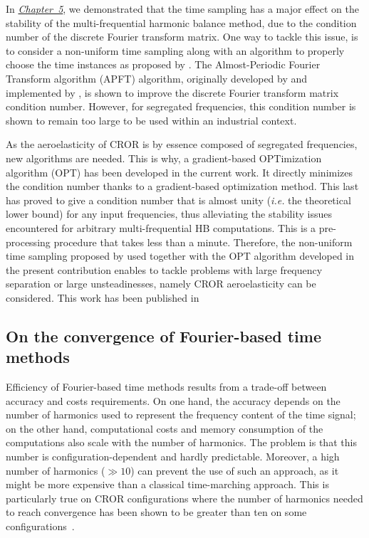 In \hyperref[cha:limitations_condition_number]{\emph{Chapter~5}},
we demonstrated that the time sampling has a major effect on the
stability of the multi-frequential harmonic balance 
method, due to the condition number of the discrete Fourier
transform matrix. One way to tackle this issue, 
is to consider a non-uniform time sampling
along with an algorithm to properly choose the time instances
as proposed by \citet{ThesisGuedeney}.
The Almost-Periodic Fourier Transform algorithm (APFT) 
algorithm, originally developed by \citet{Kundert1988} and implemented by 
\citet{ThesisGuedeney}, is shown to improve the discrete
Fourier transform matrix condition number.
However, for segregated frequencies, this condition number
is shown to remain too large to be used within an industrial context.

As the aeroelasticity of CROR is by essence
composed of segregated frequencies, new algorithms are needed.
This is why, a gradient-based OPTimization algorithm (OPT) 
has been developed in the current work.
It directly minimizes the condition number thanks to a
gradient-based optimization method. This last has proved to
give a condition number that is almost unity (\emph{i.e.} the
theoretical lower bound) for any input frequencies,
thus alleviating the stability issues encountered for arbitrary
multi-frequential HB computations.
This is a pre-processing procedure
that takes less than a minute.
Therefore, the non-uniform time sampling proposed by \citet{ThesisGuedeney}
used together with the OPT algorithm 
developed in the present contribution
enables to tackle problems with large frequency 
separation or large unsteadinesses, namely CROR aeroelasticity
can be considered.
This work has been published in
\begin{quote}
\end{quote}


\subsection*{On the convergence of Fourier-based time methods}

Efficiency of Fourier-based time methods results 
from a trade-off between accuracy and 
costs requirements.
On one hand, the accuracy depends on the number of harmonics
used to represent the frequency content of the time 
signal; on the other hand, computational costs and 
memory consumption of the computations also scale
with the number of harmonics. 
The problem is that this number is 
configuration-dependent and hardly predictable. 
Moreover, a high number of harmonics
($\gg 10$) can prevent the use of such an approach,
as it might be more expensive than a classical time-marching approach.
This is particularly true on CROR configurations where the number
of harmonics needed to reach convergence
has been shown to be greater than ten
on some configurations~\cite{ThesisFrancois}.

